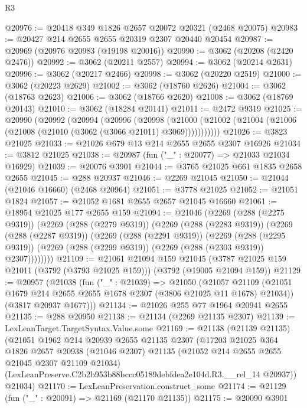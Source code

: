 \begin{lexlean}{R3}
\begin{coremodule}
@20976 := @20418 @349 @1826 @2657 @20072 @20321 (@2468 @20075)
@20983 := @20427 @214 @2655 @2655 @20319 @2307 @20440 @20454
@20987 := @20969 (@20976 @20983 (@19198 @20016))
@20990 := @3062 (@20208 (@2420 @2476))
@20992 := @3062 (@20211 @2557)
@20994 := @3062 (@20214 @2631)
@20996 := @3062 (@20217 @2466)
@20998 := @3062 (@20220 @2519)
@21000 := @3062 (@20223 @2629)
@21002 := @3062 (@18760 @2626)
@21004 := @3062 (@18763 @2623)
@21006 := @3062 (@18766 @2620)
@21008 := @3062 (@18769 @20143)
@21010 := @3062 (@18284 @20141)
@21011 := @2472 @9319
@21025 := @20990
    (@20992
      (@20994
        (@20996
          (@20998
            (@21000 (@21002 (@21004 (@21006 (@21008 (@21010 (@3062 (@3066 @21011) @3069)))))))))))
@21026 := @3823 @21025
@21033 := @21026 @679 @13 @214 @2655 @2655 @2307 @16926
@21034 := @3812 @21025
@21038 := @20987 (fun ("_" : @20077) => @21033 @21034 @16929)
@21039 := @20076 @3901
@21044 := @3765 @21025 @661 @1835 @2658 @2655
@21045 := @288 @20937
@21046 := @2269 @21045
@21050 := @21044 (@21046 @16660) (@2468 @20964)
@21051 := @3778 @21025
@21052 := @21051 @1824
@21057 := @21052 @1681 @2655 @2657 @21045 @16660
@21061 := @18954 @21025 @177 @2655 @159
@21094 := @21046
    (@2269
      (@288 (@2275 @9319))
      (@2269
        (@288 (@2279 @9319))
        (@2269
          (@288 (@2283 @9319))
          (@2269
            (@288 (@2287 @9319))
            (@2269
              (@288 (@2291 @9319))
              (@2269
                (@288 (@2295 @9319))
                (@2269 (@288 (@2299 @9319)) (@2269 (@288 (@2303 @9319)) @2307))))))))
@21109 := @21061
    @21094
    @159
    @21045
    (@3787 @21025 @159 @21011 (@3792 (@3793 @21025 @159)))
    (@3792 (@19005 @21094 @159))
@21129 := @20957
    (@21038
      (fun ("_" : @21039) =>
      @21050
        (@21057 @21109 (@21051 @1679 @214 @2655 @2655 @1678 @2307 (@3806 @21025 @11 @1678) @21034))
        (@3817 @20937 @1677)))
@21134 := @21026 @255 @77 @1964 @20941 @2655
@21135 := @288 @20950
@21138 := @21134 (@2269 @21135 @2307)
@21139 := LexLeanTarget.TargetSyntax.Value.some
@21169 := @21138
    (@21139 @21135)
    (@21051
      @1962
      @214
      @20939
      @2655
      @21135
      @2307
      (@17203
        @21025
        @364
        @1826
        @2657
        @20938
        (@21046 @2307)
        @21135
        (@21052 @214 @2655 @2655 @21045 @2307 @21109 @21034)
        (LexLeanPreserve.C2b2b953b88bccc05189debfdea2e104d.R3.__rel_14 @20937))
      @21034)
@21170 := LexLeanPreservation.construct_some
@21174 := @21129 (fun ("_" : @20091) => @21169 (@21170 @21135))
@21175 := @20090 @3901

\end{coremodule}
\end{lexlean}
